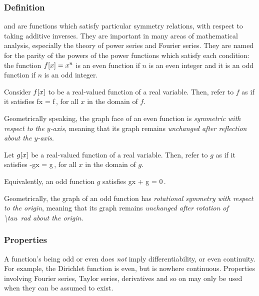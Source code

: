 \subsubsection{Definition}
 and  are functions which satisfy particular symmetry relations, with respect to taking additive inverses. They are important in many areas of mathematical analysis, especially the theory of power series and Fourier series. They are named for the parity of the powers of the power functions which satisfy each condition: the function $f\!\left[{x}\right] = x^n$ is an even function if $n$ is an even integer and it is an odd function if $n$ is an odd integer.

\begin{definition}
Consider $f\!\left[{x}\right]$ to be a real-valued function of a real variable. Then, refer to $f$ as  if it satisfies 
\beq
f\vat x = f\,,
\eeq
for all $x$ in the domain of $f$.
\end{definition}

Geometrically speaking, the graph face of an even function is \emph{symmetric with respect to the $y$-axis}, meaning that its graph remains \emph{unchanged after reflection about the $y$-axis}.

\begin{definition}
Let $g\!\left[{x}\right]$ be a real-valued function of a real variable. Then, refer to $g$ as  if it satisfies 
\beq
-g\vat x = g\,,
\eeq
for all $x$ in the domain of $g$.

Equivalently, an odd function $g$ satisfies
\beq
g\vat x + g = 0\,.
\eeq
\end{definition}
Geometrically, the graph of an odd function has \emph{rotational symmetry with respect to the origin}, meaning that its graph remains \emph{unchanged after rotation of \SI{\tau}{rad} about the origin}.


\subsubsection{Properties}
A function's being odd or even does \emph{not} imply differentiability, or even continuity. For example, the Dirichlet function is even, but is nowhere continuous. Properties involving Fourier series, Taylor series, derivatives and so on may only be used when they can be assumed to exist.

